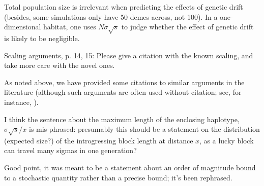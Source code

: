 \begin{point}{\revref}
Total population size is irrelevant when predicting the effects of genetic drift (besides, some simulations only have 50 demes across, not 100). In a one-dimensional habitat, one uses $N \sigma \sqrt{s}$ to judge whether the effect of genetic drift is likely to be negligible.
\end{point}

\reply
{}

\begin{point}{Scaling arguments, p. 14, 15:}
 Please give a citation with the known scaling, and take more care with the novel ones.  
\end{point}

\reply
As noted above, we have provided some citations to similar arguments in the literature
(although such arguments are often used without citation; see, for instance, \citet{durrett2007width}).

\begin{point}{\revref}
 I think the sentence about the maximum length of the enclosing haplotype, $\sigma \sqrt{s} / x$ is mis-phrased: presumably this should be a statement on the distribution (expected size?) of the introgressing block length at distance $x$, as a lucky block can travel many sigmas in one generation?
\end{point}

\reply
Good point, it was meant to be a statement about an order of magnitude bound to a stochastic quantity rather than a precise bound; it's been rephrased.

